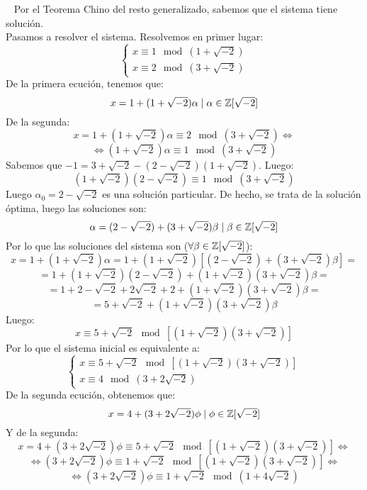 \documentclass[12pt]{article}
\begin{document}
\begin{ejercicio}[2.5 puntos]
        \ \newline
        \noindent
        Por el Teorema Chino del resto generalizado, sabemos que el sistema tiene solución.\\
        
        \noindent
        Pasamos a resolver el sistema.\newline
        Resolvemos en primer lugar:
        $$\left\{\begin{array}{l}
            x \equiv 1 \mod (1+\sqrt{-2}) \\
            x \equiv 2 \mod (3+\sqrt{-2})
        \end{array}\right.$$
        De la primera ecución, tenemos que:
        $$x = 1 + (1+\sqrt{-2})\alpha \mid \alpha \in \mathbb{Z}[\sqrt{-2}]$$
        De la segunda:
        $$x = 1 + (1+\sqrt{-2})\alpha \equiv 2\mod (3+\sqrt{-2})\Leftrightarrow$$
        $$\Leftrightarrow(1+\sqrt{-2})\alpha \equiv 1 \mod (3+\sqrt{-2})$$
        Sabemos que $-1 = 3+\sqrt{-2}-(2-\sqrt{-2})(1+\sqrt{-2})$. Luego:
        $$(1+\sqrt{-2})(2-\sqrt{-2})\equiv 1 \mod (3+\sqrt{-2})$$
        Luego $\alpha_0 = 2-\sqrt{-2}$ es una solución particular.\newline
        De hecho, se trata de la solución óptima, luego las soluciones son:
        $$\alpha = (2-\sqrt{-2})+(3+\sqrt{-2})\beta \mid \beta \in \mathbb{Z}[\sqrt{-2}]$$
        Por lo que las soluciones del sistema son ($\forall \beta \in \mathbb{Z}[\sqrt{-2}]$):
        $$x = 1+(1+\sqrt{-2})\alpha = 1+(1+\sqrt{-2})[(2-\sqrt{-2})+(3+\sqrt{-2})\beta] = $$
        $$=1+(1+\sqrt{-2})(2-\sqrt{-2})+(1+\sqrt{-2})(3+\sqrt{-2})\beta = $$
        $$=1 + 2-\sqrt{-2} +2\sqrt{-2} +2+ (1+\sqrt{-2})(3+\sqrt{-2})\beta = $$
        $$=5+\sqrt{-2} + (1+\sqrt{-2})(3+\sqrt{-2})\beta$$
        Luego:
        $$x \equiv 5+\sqrt{-2} \mod [(1+\sqrt{-2})(3+\sqrt{-2})]$$
        Por lo que el sistema inicial es equivalente a:
        $$\left\{ \begin{array}{l}
            x \equiv 5+\sqrt{-2} \mod [(1+\sqrt{-2})(3+\sqrt{-2})] \\
            x \equiv 4 \mod (3+2\sqrt{-2}) 
        \end{array}\right.$$
        De la segunda ecución, obtenemos que:
        $$x = 4+(3+2\sqrt{-2})\phi \mid \phi \in \mathbb{Z}[\sqrt{-2}]$$
        Y de la segunda:
        $$x=4+(3+2\sqrt{-2})\phi \equiv 5+\sqrt{-2} \mod [(1+\sqrt{-2})(3+\sqrt{-2})]\Leftrightarrow$$
        $$\Leftrightarrow (3+2\sqrt{-2})\phi \equiv 1+\sqrt{-2} \mod [(1+\sqrt{-2})(3+\sqrt{-2})] \Leftrightarrow$$
        $$\Leftrightarrow (3+2\sqrt{-2})\phi \equiv 1+\sqrt{-2} \mod (1+4\sqrt{-2})$$
        

\end{ejercicio}
\end{document}
